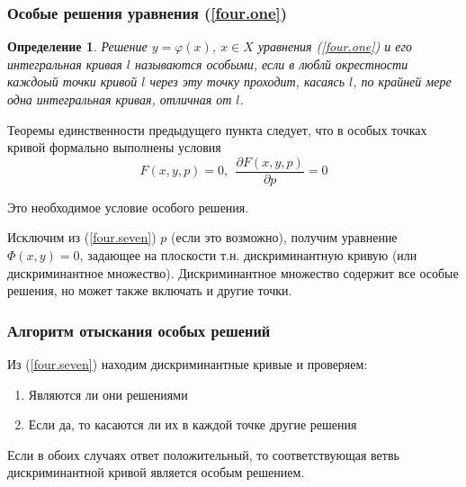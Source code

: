 \documentclass{article}
\newtheorem*{df}{Определение}
\newcommand{\pd}[2]{\frac{\partial {#1}}{\partial {#2}}}
\newcommand{\re}[1]{(\ref{#1})}
\begin{document}
  \subsubsection{Особые решения уравнения \re{four.one}}
  \begin{df}
  Решение $y = \varphi(x)$, $x \in X$ уравнения \re{four.one} и его интегральная кривая $l$ называются особыми, если в люблй окрестности каждоый точки кривой $l$ через эту точку проходит, касаясь $l$, по крайней мере одна интегральная кривая, отличная от $l$.
  \end{df}

  Теоремы единственности предыдущего пункта следует, что в особых точках кривой формально выполнены условия
  \begin{equation}
  \label{four.seven}
  F(x, y, p) = 0,~~ \pd{F(x, y, p)}{p} = 0
  \end{equation}

  Это необходимое условие особого решения.

  Исключим из \re{four.seven} $p$ (если это возможно), получим уравнение $\varPhi(x, y) = 0$, задающее на плоскости т.н. дискриминантную кривую (или дискриминантное множество). Дискриминантное множество содержит все особые решения, но может также включать и другие точки.

  \subsubsection{Алгоритм отыскания особых решений}
  Из \re{four.seven} находим дискриминантные кривые и проверяем:
  \begin{enumerate}
  \item Являются ли они решениями
  \item Если да, то касаются ли их в каждой точке другие решения
  \end{enumerate}
  Если в обоих случаях ответ положительный, то соответствующая ветвь дискриминантной кривой является особым решением.
\end{document}
